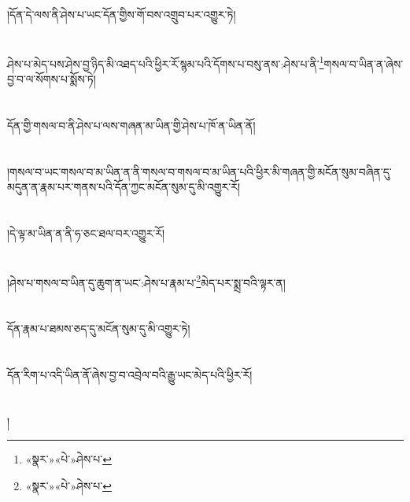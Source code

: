 །དོན་དེ་ལས་ནི་ཤེས་པ་ཡང་དོན་གྱིས་གོ་བས་འགྲུབ་པར་འགྱུར་ཏེ།\chapter{ }ཤེས་པ་མེད་པས་ཤེས་བྱ་ཉིད་མི་འཐད་པའི་ཕྱིར་རོ་སྙམ་པའི་དོགས་པ་བསུ་ནས་:ཤེས་པ་ནི་\footnote{«སྣར་»«པེ་»ཤེས་པ་}གསལ་བ་ཡིན་ན་ཞེས་བྱ་བ་ལ་སོགས་པ་སྨོས་ཏེ།\chapter{ }དོན་གྱི་གསལ་བ་ནི་ཤེས་པ་ལས་གཞན་མ་ཡིན་གྱི་ཤེས་པ་ཁོ་ན་ཡིན་ནོ།\chapter{ }།གསལ་བ་ཡང་གསལ་བ་མ་ཡིན་ན་ནི་གསལ་བ་གསལ་བ་མ་ཡིན་པའི་ཕྱིར་མི་གཞན་གྱི་མངོན་སུམ་བཞིན་དུ་མདུན་ན་རྣམ་པར་གནས་པའི་དོན་ཀྱང་མངོན་སུམ་དུ་མི་འགྱུར་རོ།\chapter{ }།དེ་ལྟ་མ་ཡིན་ན་ནི་ཧ་ཅང་ཐལ་བར་འགྱུར་རོ།\chapter{ }།ཤེས་པ་གསལ་བ་ཡིན་དུ་ཆུག་ན་ཡང་:ཤེས་པ་རྣམ་པ་\footnote{«སྣར་»«པེ་»ཤེས་པ་}མེད་པར་སྨྲ་བའི་ལྟར་ན།\chapter{ }དོན་རྣམ་པ་ཐམས་ཅད་དུ་མངོན་སུམ་དུ་མི་འགྱུར་ཏེ།\chapter{ }དོན་རིག་པ་འདི་ཡིན་ནོ་ཞེས་བྱ་བ་འབྲེལ་བའི་རྒྱུ་ཡང་མེད་པའི་ཕྱིར་རོ།\chapter{ }།
